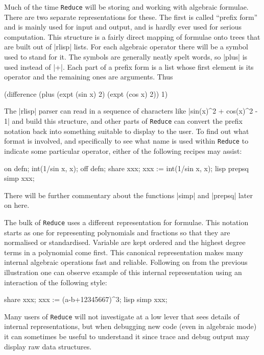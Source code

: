 \documentclass[12pt,twoside,openright]{memoir}
\newcommand{\reduce}{\texttt{Reduce}\xspace}
\begin{document}
Much of the time \reduce will be storing and working with algebraic formulae.
There are two separate representations for these. The first is called
``prefix form'' and is mainly used for input
and output, and is hardly ever used for serious computation. This
structure is a fairly direct mapping of formulae onto trees that are
built out of |rlisp| lists. For each algebraic operator there will be a symbol
used to stand for it. The symbols are generally neatly spelt words, so
|plus| is used instead of |+|. Each part of a prefix form is a list
whose first element is its operator and the remaining ones are arguments. Thus
\begin{rlispverb}
  (difference (plus (expt (sin x) 2) (expt (cos x) 2)) 1)
\end{rlispverb}
The |rlisp| parser can read in a sequence of characters like
|sin(x)^2 + cos(x)^2 - 1|
and build this structure, and other parts of
\reduce can convert the prefix notation back into something suitable to display
to the user. To find out what format is involved, and specifically to see what
name is used within \reduce to indicate some particular operator, either of
the following recipes may assist:
\begin{rlispverb}
  on defn;
  int(1/sin x, x);
  off defn;
  share xxx; %
  xxx := int(1/sin x, x);
  lisp prepsq simp xxx;
\end{rlispverb}

There will be further commentary about the functions |simp| and |prepsq|
later on here.

The bulk of \reduce uses a different representation for formulae. This notation
starts as one for representing polynomials and fractions so that they are
normalised or standardised. Variable are kept ordered and the highest degree
terms in a polynomial come first. This canonical representation makes many
internal algebraic operations fast and reliable. Following on from the
previous illustration one can observe example of this internal
representation using an interaction of the following style:
\begin{rlispverb}
  share xxx;
  xxx := (a-b+12345667)^3;
  lisp simp xxx;
\end{rlispverb}

Many users of \reduce will not investigate at a low lever that sees details of
internal representations, but when debugging new code (even in algebraic mode)
it can sometimes be useful to understand it since trace and debug output may
display raw data structures.
\end{document}
